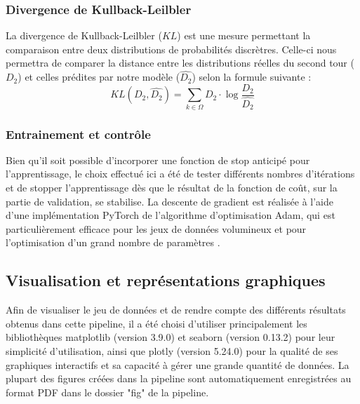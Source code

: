 \documentclass[11pt]{article}
\begin{document}
        \subsubsection*{Divergence de Kullback-Leilbler}
            La divergence de Kullback-Leilbler \cite{Kullback_Leibler_1951} ($KL$) est une mesure permettant la comparaison entre deux distributions de probabilités discrètres. Celle-ci nous permettra de comparer la distance entre les distributions réelles du second tour ($D_2$) et celles prédites par notre modèle ($\hat{D_2}$) selon la formule suivante :
            \begin{equation}
                KL(D_2,\hat{D_2}) = \sum_{k \in \Omega} D_2 \cdot \log \frac{D_2}{\hat{D_2}}
            \end{equation}

        \subsubsection*{Entrainement et contrôle}
            Bien qu'il soit possible d'incorporer une fonction de stop anticipé pour l'apprentissage, le choix effectué ici a été de tester différents nombres d'itérations et de stopper l'apprentissage dès que le résultat de la fonction de coût, sur la partie de validation, se stabilise. La descente de gradient est réalisée à l'aide d'une implémentation PyTorch de l'algorithme d'optimisation Adam, qui est particulièrement efficace pour les jeux de données volumineux et pour l'optimisation d'un grand nombre de paramètres \cite{Kingma_Ba_2017}.

        \subsection*{Visualisation et représentations graphiques}
            Afin de visualiser le jeu de données et de rendre compte des différents résultats obtenus dans cette pipeline, il a été choisi d'utiliser principalement les bibliothèques matplotlib (version 3.9.0) et seaborn (version 0.13.2) pour leur simplicité d'utilisation, ainsi que plotly (version 5.24.0) pour la qualité de ses graphiques interactifs et sa capacité à gérer une grande quantité de données. La plupart des figures créées dans la pipeline sont automatiquement enregistrées au format PDF dans le dossier "fig" de la pipeline.
            
\end{document}
